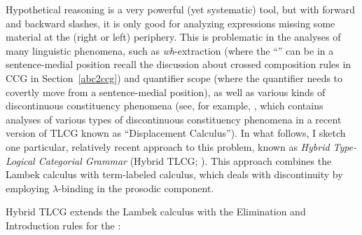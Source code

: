 \documentclass[output=paper,biblatex,babelshorthands,newtxmath,draftmode,colorlinks,citecolor=brown]{langscibook}
\begin{document}
Hypothetical reasoning is a very powerful (yet systematic) tool, but
with forward and backward slashes, it is only good for analyzing
expressions missing some material at the (right or left) periphery.
This is problematic in the analyses of many linguistic phenomena, such
as \textit{wh}-extraction (where the ``'' can be in a sentence-medial
position \emdashUS recall the discussion about crossed composition rules in
CCG in Section~\ref{abc2ccg}) and quantifier scope (where the
quantifier needs to covertly move from a sentence-medial position),
as well as various kinds of discontinuous constituency phenomena (see, 
for example,  \citealt{morrill-ea11}, which contains analyses of various
types of discontinuous constituency phenomena in a recent version of
TLCG known as ``Displacement Calculus''). In what follows, I sketch one
particular, relatively recent approach to this problem, known as
\emph{Hybrid Type-Logical Categorial Grammar} (Hybrid TLCG;
\citealt{kubota-diss,kubota-NCC,kubota-levine-coord,KubotaLevineBook}).
This approach combines the Lambek calculus with 
term-labeled calculus, which deals with discontinuity by employing
$\lambda$-binding in the prosodic component.

Hybrid TLCG extends the Lambek calculus with the Elimination and Introduction rules for the
:

\ea
\label{scoping}
\label{upI} %
\z
\end{document}
